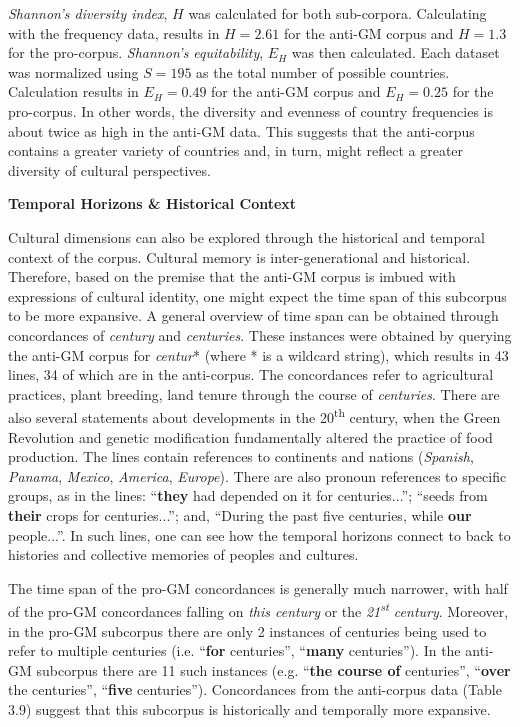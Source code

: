 \textit{Shannon's diversity index}, \(H\) was calculated for both sub-corpora. Calculating with the frequency data, results in \(H=2.61\) for the anti-GM corpus and \(H=1.3\) for the pro-corpus. \textit{Shannon's equitability}, \(E_H\) was then calculated. Each dataset was normalized using \(S=195\) as the total number of possible countries. Calculation results in \(E_H=0.49\) for the anti-GM corpus and \(E_H=0.25\) for the pro-corpus. In other words, the diversity and evenness of country frequencies is about twice as high in the anti-GM data. This suggests that the anti-corpus contains a greater variety of countries and, in turn, might reflect a greater diversity of cultural perspectives.

\textbf{Temporal Horizons \& Historical Context}

Cultural dimensions can also be explored through the historical and temporal context of the corpus. Cultural memory is inter-generational and historical. Therefore, based on the premise that the anti-GM corpus is imbued with expressions of cultural identity, one might expect the time span of this subcorpus to be more expansive. A general overview of time span can be obtained through concordances of \textit{century} and \textit{centuries}. These instances were obtained by querying the anti-GM corpus for \textit{centur}* (where * is a wildcard string), which results in 43 lines, 34 of which are in the anti-corpus. The concordances refer to agricultural practices, plant breeding, land tenure through the course of \textit{centuries}. There are also several statements about developments in the 20\textsuperscript{th} century, when the Green Revolution and genetic modification fundamentally altered the practice of food production.  The lines contain references to continents and nations (\textit{Spanish}, \textit{Panama}, \textit{Mexico}, \textit{America}, \textit{Europe}). There are also pronoun references to specific groups, as in the lines: ``\textbf{they} had depended on it for centuries...''; ``seeds from \textbf{their} crops for centuries...''; and, ``During the past five centuries, while \textbf{our} people...''. In such lines, one can see how the temporal horizons connect to back to histories and collective memories of peoples and cultures.
   
The time span of the pro-GM concordances is generally much narrower, with half of the pro-GM concordances falling on \textit{this century} or the \textit{21\textsuperscript{st} century}. Moreover, in the pro-GM subcorpus there are only 2 instances of centuries being used to refer to multiple centuries (i.e. ``\textbf{for} centuries'', ``\textbf{many} centuries''). In the anti-GM subcorpus there are 11 such instances (e.g. ``\textbf{the course of} centuries'', ``\textbf{over} the centuries'', ``\textbf{five} centuries''). Concordances from the anti-corpus data (Table 3.9) suggest that this subcorpus is historically and temporally more expansive.

